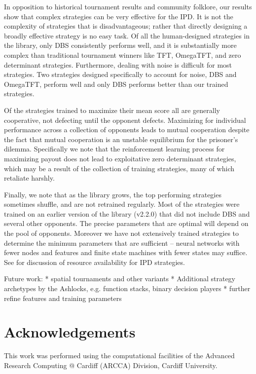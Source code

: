 \documentclass{article}
\begin{document}
In opposition to historical tournament results and community folklore,
our results show that complex strategies can be very effective for the
IPD. It is not the complexity of strategies that is disadvantageous; rather that directly
designing a broadly effective strategy is no easy task. Of all the human-designed
strategies in the library, only DBS consistently performs well, and it is
substantially more complex than traditional tournament winners like TFT, OmegaTFT,
and zero determinant strategies. Furthermore, dealing with noise is difficult
for most strategies. Two strategies designed specifically to account for noise,
DBS and OmegaTFT, perform well and only DBS performs better than our trained
strategies.

Of the strategies trained to maximize their mean score all are generally
cooperative, not defecting until the opponent defects. Maximizing for individual
performance across a collection of opponents leads to mutual cooperation despite
the fact that mutual cooperation is an unstable equilibrium for the prisoner's
dilemma. Specifically we note that the reinforcement learning process for maximizing
payout does not
lead to exploitative zero determinant strategies, which may be a result of the
collection of training strategies, many of which retaliate harshly.

Finally, we note that as the library grows, the top performing strategies
sometimes shuffle, and are not retrained regularly. Most of the strategies were
trained on an earlier version of the library (v2.2.0) that did not include DBS
and several other opponents. The precise parameters that are optimal will depend
on the pool of opponents. Moreover we have not extensively trained strategies to
determine the minimum parameters that are sufficient -- neural networks with
fewer nodes and features and finite state machines with fewer states may suffice.
See \cite{ashlock2013impact} for discussion of resource availability for IPD strategies.


Future work:
* spatial tournaments and other variants
* Additional strategy archetypes by the Ashlocks, e.g. function stacks, binary
decision players
* further refine features and training parameters



\section*{Acknowledgements}

This work was performed using the computational facilities of the Advanced
Research Computing @ Cardiff (ARCCA) Division, Cardiff University.

\printbibliography
\end{document}
